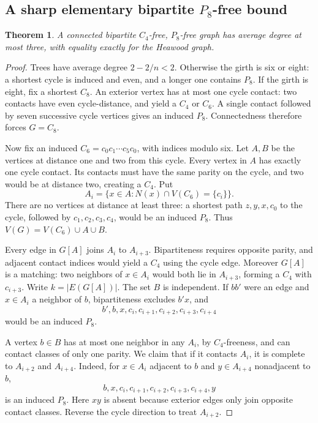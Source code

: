\documentclass[11pt,a4paper]{article}
\newtheorem{theorem}{Theorem}[section]
\theoremstyle{definition}\newtheorem{definition}[theorem]{Definition}
\theoremstyle{remark}\newtheorem{remark}[theorem]{Remark}
\begin{document}
\subsection{\texorpdfstring{A sharp elementary bipartite $P_8$-free bound}{A sharp elementary bipartite P8-free bound}}
\begin{theorem}\label{local9:thm:p8}
A connected bipartite $C_4$-free, $P_8$-free graph has average degree at
most three, with equality exactly for the Heawood graph.
\end{theorem}
\begin{proof}
Trees have average degree $2-2/n<2$. Otherwise the girth is six or eight:
a shortest cycle is induced and even, and a longer one contains $P_8$.
If the girth is eight, fix a shortest $C_8$. An exterior vertex has at
most one cycle contact: two contacts have even cycle-distance, and yield
a $C_4$ or $C_6$. A single contact followed by seven successive cycle
vertices gives an induced $P_8$. Connectedness therefore forces $G=C_8$.

Now fix an induced $C_6=c_0c_1\cdots c_5c_0$, with indices modulo six.
Let $A,B$ be the vertices at distance one and two from this cycle.
Every vertex in $A$ has exactly one cycle contact. Its contacts must have
the same parity on the cycle, and two would be at distance two, creating
a $C_4$. Put
\[
 A_i=\{x\in A:N(x)\cap V(C_6)=\{c_i\}\}.
\]
There are no vertices at distance at least three: a shortest path
$z,y,x,c_0$ to the cycle, followed by $c_1,c_2,c_3,c_4$, would be an
induced $P_8$. Thus $V(G)=V(C_6)\cup A\cup B$.

Every edge in $G[A]$ joins $A_i$ to $A_{i+3}$. Bipartiteness requires
opposite parity, and adjacent contact indices would yield a $C_4$ using
the cycle edge. Moreover $G[A]$ is a matching: two neighbors of
$x\in A_i$ would both lie in $A_{i+3}$, forming a $C_4$ with $c_{i+3}$.
Write $k=|E(G[A])|$. The set $B$ is independent. If $bb'$ were an edge
and $x\in A_i$ a neighbor of $b$, bipartiteness excludes $b'x$, and
\[
 b',b,x,c_i,c_{i+1},c_{i+2},c_{i+3},c_{i+4}
\]
would be an induced $P_8$.

A vertex $b\in B$ has at most one neighbor in any $A_i$, by $C_4$-freeness,
and can contact classes of only one parity. We claim that if it contacts
$A_i$, it is complete to $A_{i+2}$ and $A_{i+4}$. Indeed, for
$x\in A_i$ adjacent to $b$ and $y\in A_{i+4}$ nonadjacent to $b$,
\[
 b,x,c_i,c_{i+1},c_{i+2},c_{i+3},c_{i+4},y
\]
is an induced $P_8$. Here $xy$ is absent because exterior edges only join
opposite contact classes. Reverse the cycle direction to treat $A_{i+2}$.


\end{proof}
\end{document}
